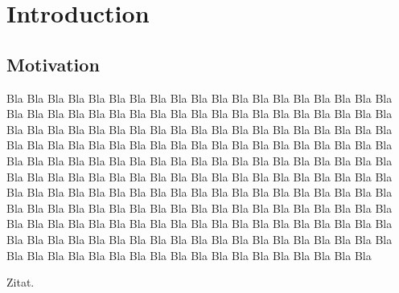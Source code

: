 %
%
%
%
%
%
%

\chapter{Introduction}

\section{Motivation}
\label{sec:Motivation}

Bla Bla Bla Bla Bla Bla Bla Bla Bla Bla Bla Bla Bla Bla Bla Bla Bla Bla Bla Bla Bla Bla Bla Bla Bla Bla Bla Bla Bla Bla Bla Bla Bla Bla Bla Bla Bla Bla Bla Bla Bla Bla Bla Bla Bla Bla Bla Bla Bla Bla Bla Bla Bla Bla Bla Bla Bla Bla Bla Bla Bla Bla Bla Bla Bla Bla Bla Bla Bla Bla Bla Bla Bla Bla Bla Bla Bla Bla Bla Bla Bla Bla Bla Bla Bla Bla Bla Bla Bla Bla Bla Bla Bla Bla Bla Bla Bla Bla Bla Bla Bla Bla Bla Bla Bla Bla Bla Bla Bla Bla Bla Bla Bla Bla Bla Bla Bla Bla Bla Bla Bla Bla Bla Bla Bla Bla Bla Bla Bla Bla Bla Bla Bla Bla Bla Bla Bla Bla Bla Bla Bla Bla Bla Bla Bla Bla Bla Bla Bla Bla Bla Bla Bla Bla Bla Bla Bla Bla Bla Bla Bla Bla Bla Bla Bla Bla Bla Bla Bla Bla Bla Bla Bla Bla Bla Bla Bla Bla Bla Bla Bla Bla Bla Bla Bla Bla Bla Bla Bla Bla Bla Bla Bla Bla Bla Bla Bla Bla Bla Bla Bla Bla Bla Bla Bla Bla Bla Bla 

\cite{wilcox} Zitat.
